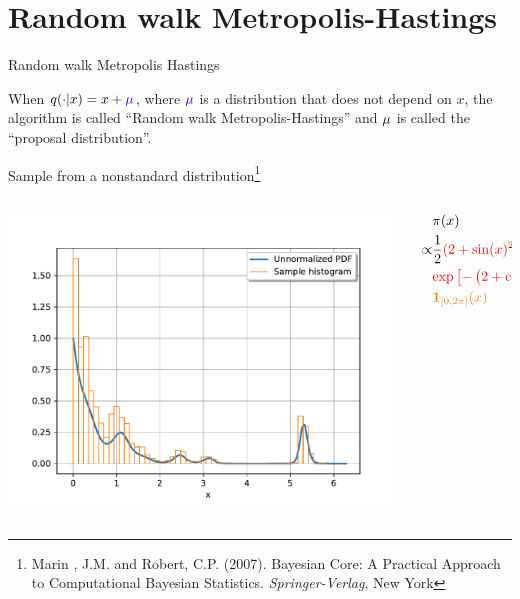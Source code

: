 \documentclass{beamer}
\newcommand{\target}[1]{\textcolor{red}{#1}}
\newcommand{\proposal}[1]{\textcolor{blue}{#1}}
\newcommand{\support}[1]{\textcolor{orange}{#1}}
\begin{document}
\section{Random walk Metropolis-Hastings}
\begin{frame}[containsverbatim]{Random walk Metropolis Hastings}

    When $q(\cdot | x) = x + \proposal{\mu}$, where $\proposal{\mu}$ is a distribution that does not depend on $x$,
    the  algorithm is called ``Random walk Metropolis-Hastings'' and $\proposal{}\mu$ is called the ``proposal distribution''.


    \begin{block}{Sample from a nonstandard distribution\footnote{Marin , J.M. and Robert, C.P. (2007). Bayesian Core: A Practical Approach to Computational Bayesian Statistics. \emph{Springer-Verlag}, New York}}
        \begin{columns}
            \begin{column}{0.4\textwidth}
                \includegraphics[width=\textwidth]{figures/ChristianRobert_tough_density}
            \end{column}
            \begin{column}{0.6\textwidth}
                \vspace{-0.5cm}
                \begin{align*}
                    & \pi(x) \\ \propto & \frac{1}{2} \target{(2 + \sin(x)^2)} \\
                    & \target{\exp \left[- \left(2 + \cos(3x)^3 + \sin(2x)^3 \right) x \right]} \\
                    & \support{\mathbf{1}_{[0, 2 \pi]}(x)}
                \end{align*}
            \end{column}
        \end{columns}



\end{block}
\end{frame}
\end{document}
